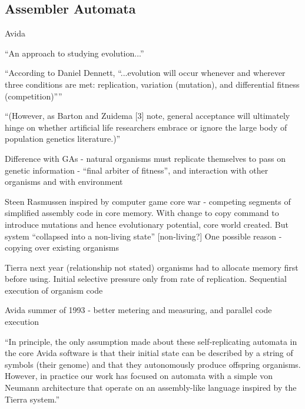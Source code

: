 \subsection{Assembler Automata}

Avida  \autocite{Ofria2004}

``An approach to studying evolution...''

``According to Daniel Dennett, ``...evolution will occur whenever and wherever three conditions are met: replication, variation (mutation), and differential fitness (competition)''''

``(However, as Barton and Zuidema {[}3{]} note, general acceptance will ultimately hinge on whether artificial life researchers embrace or ignore the large body of population genetics literature.)''

Difference with GAs - natural organisms must replicate themselves to pass on genetic information - ``final arbiter of fitness'', and interaction with other organisms and with environment \autocite{Ofria2004}

Steen Rasmussen inspired by computer game core war - competing segments of simplified assembly code in core memory. With change to copy command to introduce mutations and hence evolutionary potential,
core world created. But system ``collapsed into a non-living state'' {[}non-living?{]} One possible reason - copying over existing organisms

Tierra next year (relationship not stated) organisms had to allocate memory first before using. Initial selective pressure only from rate of replication. Sequential execution of organism code

Avida summer of 1993 - better metering and measuring, and parallel code execution

``In principle, the only assumption made about these self-replicating automata in the core Avida software is that their initial state can be described by a string of symbols (their genome) and that they autonomously produce offspring organisms. However, in practice our work has focused on automata with a simple von Neumann architecture that operate on an assembly-like language inspired by
the Tierra system.''

